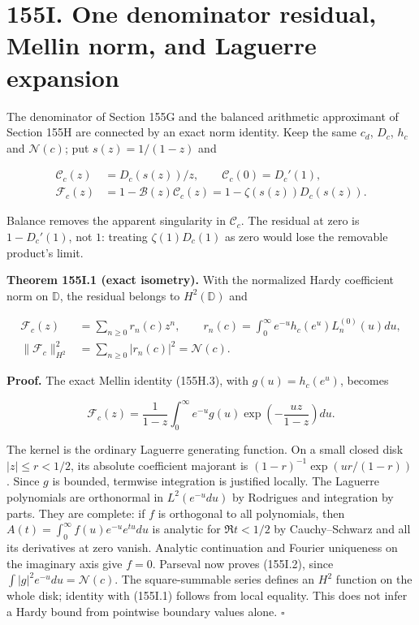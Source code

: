 \documentclass[
  11pt,
]{book}
\begin{document}
\section{155I. One denominator residual, Mellin norm, and Laguerre
expansion}\label{i.-one-denominator-residual-mellin-norm-and-laguerre-expansion}

The denominator of Section 155G and the balanced arithmetic approximant
of Section 155H are connected by an exact norm identity. Keep the same
\(c_d\), \(D_c\), \(h_c\) and \(\mathscr N(c)\); put \(s(z)=1/(1-z)\)
and

\[
\begin{aligned}
\mathcal C_c(z)&=D_c(s(z))/z,\qquad
 \mathcal C_c(0)=D_c'(1),\\
\mathcal F_c(z)&=1-\mathcal B(z)\mathcal C_c(z)
 =1-\zeta(s(z))D_c(s(z)).
\end{aligned}
\tag{155I.1}
\]

Balance removes the apparent singularity in \(\mathcal C_c\). The
residual at zero is \(1-D_c'(1)\), not \(1\): treating
\(\zeta(1)D_c(1)\) as zero would lose the removable product's limit.

\textbf{Theorem 155I.1 (exact isometry).} With the normalized Hardy
coefficient norm on \(\mathbb D\), the residual belongs to
\(H^2(\mathbb D)\) and

\[
\boxed{\begin{aligned}
\mathcal F_c(z)&=\sum_{n\ge0}r_n(c)z^n,\qquad
 r_n(c)=\int_0^\infty e^{-u}h_c(e^u)L_n^{(0)}(u)du,\\
\|\mathcal F_c\|_{H^2}^2&=\sum_{n\ge0}|r_n(c)|^2=\mathscr N(c).
\end{aligned}}
\tag{155I.2}
\]

\textbf{Proof.} The exact Mellin identity (155H.3), with
\(g(u)=h_c(e^u)\), becomes

\[
\mathcal F_c(z)=\frac1{1-z}\int_0^\infty e^{-u}g(u)
          \exp\!\left(-\frac{uz}{1-z}\right)du.
\tag{155I.3}
\]

The kernel is the ordinary Laguerre generating function. On a small
closed disk \(|z|\le r<1/2\), its absolute coefficient majorant is
\((1-r)^{-1}\exp(ur/(1-r))\). Since \(g\) is bounded, termwise
integration is justified locally. The Laguerre polynomials are
orthonormal in \(L^2(e^{-u}du)\) by Rodrigues and integration by parts.
They are complete: if \(f\) is orthogonal to all polynomials, then
\(A(t)=\int_0^\infty f(u)e^{-u}e^{tu}du\) is analytic for \(\Re t<1/2\)
by Cauchy--Schwarz and all its derivatives at zero vanish. Analytic
continuation and Fourier uniqueness on the imaginary axis give \(f=0\).
Parseval now proves (155I.2), since \(\int|g|^2e^{-u}du=\mathscr N(c)\).
The square-summable series defines an \(H^2\) function on the whole
disk; identity with (155I.1) follows from local equality. This does not
infer a Hardy bound from pointwise boundary values alone. \(\square\)
\end{document}
